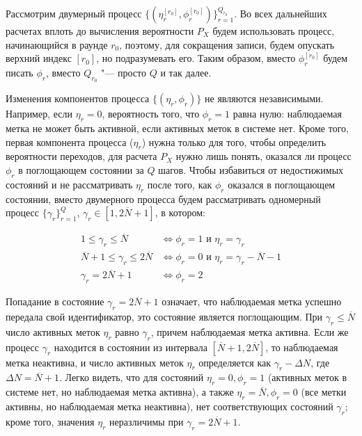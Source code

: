 Рассмотрим двумерный процесс $\{ (\eta_r^{[r_0]}, \phi_r^{[r_0]}) \}_{r=1}^{Q_{r_0}}$. Во всех дальнейших расчетах вплоть до вычисления вероятности $P_X$ будем использовать процесс, начинающийся в раунде $r_0$, поэтому, для сокращения записи, будем опускать верхний индекс $[r_0]$, но подразумевать его. Таким образом, вместо $\phi_r^{[r_0]}$ будем писать $\phi_r$, вместо $Q_{r_0}$ "--- просто $Q$ и так далее.

Изменения компонентов процесса $\{ (\eta_r, \phi_r) \}$ не являются независимыми. Например, если $\eta_r = 0$, вероятность того, что $\phi_r = 1$ равна нулю: наблюдаемая метка не может быть активной, если активных меток в системе нет. Кроме того, первая компонента процесса ($\eta_r$) нужна только для того, чтобы определить вероятности переходов, для расчета $P_X$ нужно лишь понять, оказался ли процесс $\phi_r$ в поглощающем состоянии за $Q$ шагов. Чтобы избавиться от недостижимых состояний и не рассматривать $\eta_r$ после того, как $\phi_r$ оказался в поглощающем состоянии, вместо двумерного процесса будем рассматривать одномерный процесс $\{ \gamma_r \}_{r=1}^Q$, $\gamma_r \in [1, 2\overline{N}+1]$, в котором:

\begin{equation}\label{eq:ch3_gamma_process}
	\begin{aligned}
		1 \leqslant \gamma_r \leqslant \overline{N}                 &\Leftrightarrow \phi_r = 1 \text{ и } \eta_r = \gamma_r \\
		\overline{N} + 1 \leqslant \gamma_r \leqslant 2\overline{N} &\Leftrightarrow \phi_r = 0 \text{ и } \eta_r = \gamma_r - \overline{N} - 1\\
		\gamma_r = 2\overline{N}+1                                  &\Leftrightarrow \phi_r = 2
	\end{aligned}
\end{equation}

Попадание в состояние $\gamma_r = 2\overline{N} + 1$ означает, что наблюдаемая метка успешно передала свой идентификатор, это состояние является поглощающим. При $\gamma_r \leqslant \overline{N}$ число активных меток $\eta_r$ равно $\gamma_r$, причем наблюдаемая метка активна. Если же процесс $\gamma_r$ находится в состоянии из интервала $[\overline{N}+1, 2\overline{N}]$, то наблюдаемая метка неактивна, и число активных меток $\eta_r$ определяется как $\gamma_r - \Delta N$, где $\Delta N = \overline{N} + 1$. Легко видеть, что для состояний $\eta_r = 0, \phi_r = 1$ (активных меток в системе нет, но наблюдаемая метка активна), а также $\eta_r = \overline{N}, \phi_r = 0$ (все метки активны, но наблюдаемая метка неактивна), нет соответствующих состояний $\gamma_r$; кроме того, значения $\eta_r$ неразличимы при $\gamma_r = 2\overline{N} + 1$.

